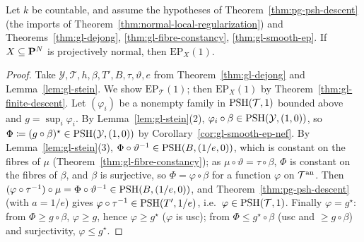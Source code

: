 \begin{proposition}\label{prop:gl-ample-countable}
\leanok
{}
Let $k$ be countable, and assume the hypotheses of Theorem~\ref{thm:pg-psh-descent} (the imports of Theorem~\ref{thm:normal-local-regularization}) and
Theorems~\ref{thm:gl-dejong}, \ref{thm:gl-fibre-constancy}, \ref{thm:gl-smooth-ep}. If $X\subseteq\mathbf{P}^N$ is projectively normal, then $\mathrm{EP}_X(1)$.
\end{proposition}

\begin{proof}
Take $\mathcal Y,\mathcal T,h,\beta,T',B,\tau,\vartheta,e$ from Theorem~\ref{thm:gl-dejong} and Lemma~\ref{lem:gl-stein}. We show $\mathrm{EP}_{\mathcal T}(1)$; then
$\mathrm{EP}_X(1)$ by Theorem~\ref{thm:gl-finite-descent}. Let $(\varphi_i)$ be a nonempty family in $\operatorname{PSH}(\mathcal T,1)$ bounded above and $g=\sup_i\varphi_i$. By
Lemma~\ref{lem:gl-stein}(2), $\varphi_i\circ\beta\in\operatorname{PSH}(\mathcal Y,(1,0))$, so $\Phi\coloneqq(g\circ\beta)^\star\in\operatorname{PSH}(\mathcal Y,(1,0))$ by
Corollary~\ref{cor:gl-smooth-ep-nef}. By Lemma~\ref{lem:gl-stein}(3), $\Phi\circ\vartheta^{-1}\in\operatorname{PSH}(B,(1/e,0))$, which is constant on the fibres of $\mu$
(Theorem~\ref{thm:gl-fibre-constancy}); as $\mu\circ\vartheta=\tau\circ\beta$, $\Phi$ is constant on the fibres of $\beta$, and $\beta$ is surjective, so $\Phi=\varphi\circ\beta$
for a function $\varphi$ on $\mathcal T^{\mathrm{an}}$. Then $(\varphi\circ\tau^{-1})\circ\mu=\Phi\circ\vartheta^{-1}\in\operatorname{PSH}(B,(1/e,0))$, and Theorem~\ref{thm:pg-psh-descent} (with
$a=1/e$) gives $\varphi\circ\tau^{-1}\in\operatorname{PSH}(T',1/e)$, i.e.\ $\varphi\in\operatorname{PSH}(\mathcal T,1)$. Finally $\varphi=g^\star$: from $\Phi\ge g\circ\beta$, $\varphi\ge g$, hence $\varphi\ge
g^\star$ ($\varphi$ is usc); from $\Phi\le g^\star\circ\beta$ (usc and $\ge g\circ\beta$) and surjectivity, $\varphi\le g^\star$.
\end{proof}

